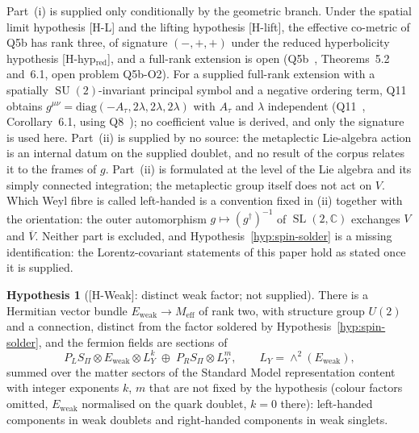 \documentclass[11pt,a4paper]{article}
\theoremstyle{definition}
\newtheorem{hypothesis}[theorem]{Hypothesis}
\theoremstyle{remark}
\newcommand{\SL}{\operatorname{SL}}
\newcommand{\SU}{\operatorname{SU}}
\begin{document}
    Part~(i) is supplied only conditionally by the geometric branch.
    Under the spatial limit hypothesis [H-L] and the lifting hypothesis [H-lift], the effective co-metric
    of Q5b has rank three, of signature $(-,+,+)$ under the reduced hyperbolicity hypothesis
    [H-hyp$_{\mathrm{red}}$], and a full-rank extension is open (Q5b~\cite{Beau2026q5b}, Theorems~5.2
    and~6.1, open problem Q5b-O2).
    For a supplied full-rank extension with a spatially $\SU(2)$-invariant principal symbol and a negative
    ordering term, Q11 obtains $g^{\mu\nu} = \mathrm{diag}(-A_\tau, 2\lambda, 2\lambda, 2\lambda)$ with
    $A_\tau$ and $\lambda$ independent (Q11~\cite{Beau2026q11}, Corollary~6.1, using
    Q8~\cite{BeauQ8}); no coefficient value is derived, and only the signature is used here.
    Part~(ii) is supplied by no source: the metaplectic Lie-algebra action is an internal datum on the
    supplied doublet, and no result of the corpus relates it to the frames of $g$.
    Part~(ii) is formulated at the level of the Lie algebra and its simply connected integration; the
    metaplectic group itself does not act on $V$.
    Which Weyl fibre is called left-handed is a convention fixed in (ii) together with the orientation:
    the outer automorphism $g \mapsto (g^\dagger)^{-1}$ of $\SL(2,\mathbb{C})$ exchanges $V$ and
    $\overline{V}$.
    Neither part is excluded, and Hypothesis~\ref{hyp:spin-solder} is a missing identification: the
    Lorentz-covariant statements of this paper hold as stated once it is supplied.

    \begin{hypothesis}[{[H-Weak]}: distinct weak factor; not supplied]
      \label{hyp:weak-factor}
      There is a Hermitian vector bundle $E_{\mathrm{weak}} \to M_{\mathrm{eff}}$ of rank two, with structure
      group $U(2)$ and a connection, distinct from the factor soldered by
      Hypothesis~\ref{hyp:spin-solder}, and the fermion fields are sections of
      \[
        P_L S_\Pi \otimes E_{\mathrm{weak}} \otimes L_Y^{k}
        \;\oplus\;
        P_R S_\Pi \otimes L_Y^{m},
        \qquad
        L_Y = \wedge^2(E_{\mathrm{weak}}),
      \]
      summed over the matter sectors of the Standard Model representation content with integer exponents
      $k$, $m$ that are not fixed by the hypothesis (colour factors omitted, $E_{\mathrm{weak}}$ normalised
      on the quark doublet, $k = 0$ there): left-handed components in weak doublets and right-handed
      components in weak singlets.
    \end{hypothesis}
\end{document}
